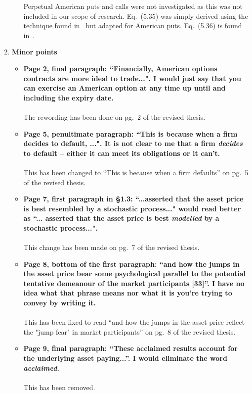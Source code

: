 \documentclass{article}
\begin{document}
\begin{enumerate}
\begin{itemize}
	 Perpetual American puts and calls were not investigated as this was not included in our scope of research. Eq.~(5.35) was simply derived using the technique found in~\cite{Chiarella2006} but adapted for American puts. Eq.~(5.36) is found in~\cite{Chiarella2006}.
					\end{itemize}
					
	\item{\textbf{Minor points}}
		\begin{itemize}
			\item{\textbf{Page 2, final paragraph: ``Financially, American options contracts are more ideal to trade...". I would just say that you can exercise an American option at any time up until and including the expiry date.
			\\\\}
			The rewording has been done on pg.~2 of the revised thesis.}
			
			\item{\textbf{Page 5, penultimate paragraph: ``This is because when a firm decides to default, ...". It is not clear to me that a firm \emph{decides} to default -- either it can meet its obligations or it can't.
			\\\\}
			This has been changed to ``This is because when a firm defaults'' on pg.~5 of the revised thesis.}
			
			\item{\textbf{Page 7, first paragraph in \S1.3: ``...asserted that the asset price is best resembled by a stochastic process..." would read better as ``... asserted that the asset price is best \emph{modelled} by a stochastic process...".
			\\\\}
			This change has been made on pg.~7 of the revised thesis.}
			
			\item{\textbf{Page 8, bottom of the first paragraph: ``and how the jumps in the asset price bear some psychological parallel to the potential tentative demeanour of the market participants [33]''. I have no idea what that phrase means nor what it is you're trying to convey by writing it.
			\\\\}
			This has been fixed to read ``and how the jumps in the asset price reflect the "jump fear" in market participants'' on pg.~8 of the revised thesis.}
			
			\item{\textbf{Page 9, final paragraph: ``These acclaimed results account for the underlying asset paying...''. I would eliminate the word \emph{acclaimed}.
			\\\\}}
			This has been removed.
			

\end{itemize}
\end{enumerate}
\end{document}
